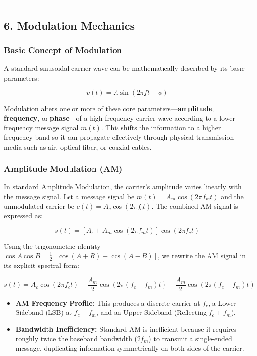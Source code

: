 \documentclass[
]{article}
\providecommand{\tightlist}{%
  \setlength{\itemsep}{0pt}\setlength{\parskip}{0pt}}
\begin{document}
\begin{center}\rule{0.5\linewidth}{0.5pt}\end{center}

\subsection{6. Modulation Mechanics}\label{modulation-mechanics}

\subsubsection{Basic Concept of
Modulation}\label{basic-concept-of-modulation}

A standard sinusoidal carrier wave can be mathematically described by
its basic parameters:

\[v(t) = A \sin(2\pi f t + \phi)\]

Modulation alters one or more of these core
parameters---\textbf{amplitude}, \textbf{frequency}, or
\textbf{phase}---of a high-frequency carrier wave according to a
lower-frequency message signal \(m(t)\). This shifts the information to
a higher frequency band so it can propagate effectively through physical
transmission media such as air, optical fiber, or coaxial cables.

\subsubsection{Amplitude Modulation (AM)}\label{amplitude-modulation-am}

In standard Amplitude Modulation, the carrier's amplitude varies
linearly with the message signal. Let a message signal be
\(m(t) = A_m \cos(2\pi f_m t)\) and the unmodulated carrier be
\(c(t) = A_c \cos(2\pi f_c t)\). The combined AM signal is expressed as:

\[s(t) = [A_c + A_m \cos(2\pi f_m t)] \cos(2\pi f_c t)\]

Using the trigonometric identity
\(\cos A \cos B = \frac{1}{2}[\cos(A+B) + \cos(A-B)]\), we rewrite the
AM signal in its explicit spectral form:

\[s(t) = A_c \cos(2\pi f_c t) + \frac{A_m}{2}\cos(2\pi(f_c+f_m)t) + \frac{A_m}{2}\cos(2\pi(f_c-f_m)t)\]

\begin{itemize}
\tightlist
\item
  \textbf{AM Frequency Profile:} This produces a discrete carrier at
  \(f_c\), a Lower Sideband (LSB) at \(f_c - f_m\), and an Upper
  Sideband (Reflecting \(f_c + f_m\)).
\item
  \textbf{Bandwidth Inefficiency:} Standard AM is inefficient because it
  requires roughly twice the baseband bandwidth (\(2f_m\)) to transmit a
  single-ended message, duplicating information symmetrically on both
  sides of the carrier.
\end{itemize}
\end{document}

